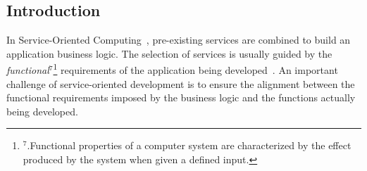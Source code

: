 \documentclass[12pt,twoside]{article}
\theoremstyle{plain}
\theoremstyle{plain}
\begin{document}

\begin{multicols}{2}
\normalsize

\section{Introduction}
\label{sec:intro}





In Service-Oriented Computing~\cite{Papazoglou2007}, pre-ex\-isting services are
combined to build an application business logic.
The selection of services is usually guided by the \textit{functional}$^7$\footnote{$^7$.Functional properties of a computer system are characterized by the effect produced by the system when given a defined input.} requirements of the application being developed~\cite{2,decastro1,PapazoglouH06}.
An important challenge of service-o\-rien\-ted development is  to ensure the alignment between the functional requirements imposed by the business logic and the functions actually being developed.


\end{multicols}
\end{document}
